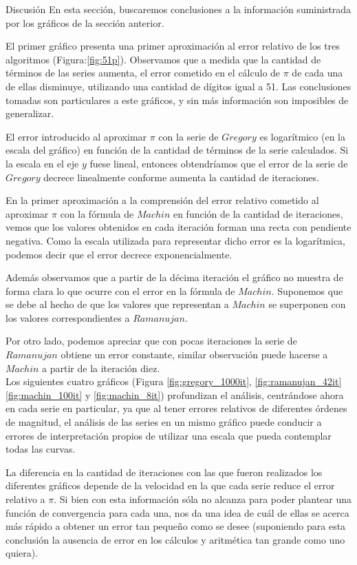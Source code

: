 \begin{section}{Discusión}
	En esta sección, buscaremos conclusiones a la información suministrada por los gráficos de la sección anterior.
	
	El primer gráfico presenta una primer aproximación al error relativo de los tres algoritmos (Figura:\ref{fig:51p}).
	Observamos que a medida que la cantidad de términos de las series aumenta, el error cometido en el cálculo de $\pi$ de cada una de ellas disminuye, utilizando una cantidad de dígitos igual a 51. Las conclusiones tomadas son particulares a este gráficos, y sin más información son imposibles de generalizar.
	
	El error introducido al aproximar $\pi$ con la serie de $Gregory$ es logarítmico (en la escala del gráfico) en función de la cantidad de términos de la serie calculados. Si la escala en el eje $y$ fuese lineal, entonces obtendríamos que el error de la serie de $Gregory$ decrece linealmente conforme aumenta la cantidad de iteraciones.
	
	En la primer aproximación a la comprensión del error relativo cometido al aproximar $\pi$ con la fórmula de $Machin$ en función de la cantidad de iteraciones, vemos que los valores obtenidos en cada iteración forman una recta con pendiente negativa. Como la escala utilizada para representar dicho error es la logarítmica, podemos decir que el error decrece exponencialmente.
	
	Además observamos que a partir de la décima iteración el gráfico no muestra de forma clara lo que ocurre con el error en la fórmula de $Machin$. Suponemos que se debe al hecho de que los valores que representan a $Machin$ se superponen con los valores correspondientes a $Ramanujan$.
	
	Por otro lado, podemos apreciar que con pocas iteraciones la serie de $Ramanujan$ obtiene un error constante, similar observación puede hacerse a $Machin$ a partir de la iteración diez.\\
	
	Los siguientes cuatro gráficos (Figura \ref{fig:gregory_1000it}, \ref{fig:ramanujan_42it} \ref{fig:machin_100it} y \ref{fig:machin_8it}) profundizan el análisis, centrándose ahora en cada serie en particular, ya que al tener errores relativos de diferentes órdenes de magnitud, el análisis de las series en un mismo gráfico puede conducir a errores de interpretación propios de utilizar una escala que pueda contemplar todas las curvas.
	
	La diferencia en la cantidad de iteraciones con las que fueron realizados los diferentes gráficos depende de la velocidad en la que cada serie reduce el error relativo a $\pi$. Si bien con esta información sóla no alcanza para poder plantear una función de convergencia para cada una, nos da una idea de cuál de ellas se acerca más rápido a obtener un error tan pequeño como se desee (suponiendo para esta conclusión la ausencia de error en los cálculos y aritmética tan grande como uno quiera).
	

\end{section}
